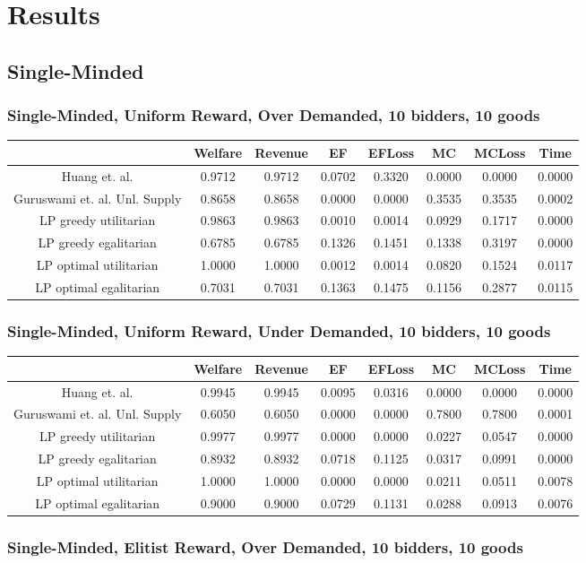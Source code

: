 \section{Results}
\subsection{Single-Minded}
\subsubsection*{Single-Minded, Uniform Reward, Over Demanded, 10 bidders, 10 goods} 
\begin{tabular}{|c|c|c|c|c|c|c|c|}\hline
                            	&Welfare	&Revenue	&EF	&EFLoss	&MC	&MCLoss	&Time	\\\hline
                 Huang et. al.	&0.9712	&0.9712	&0.0702	&0.3320	&0.0000	&0.0000	&0.0000	\\\hline 
 Guruswami et. al. Unl. Supply	&0.8658	&0.8658	&0.0000	&0.0000	&0.3535	&0.3535	&0.0002	\\\hline 
         LP greedy utilitarian	&0.9863	&0.9863	&0.0010	&0.0014	&0.0929	&0.1717	&0.0000	\\\hline 
         LP greedy egalitarian	&0.6785	&0.6785	&0.1326	&0.1451	&0.1338	&0.3197	&0.0000	\\\hline 
        LP optimal utilitarian	&1.0000	&1.0000	&0.0012	&0.0014	&0.0820	&0.1524	&0.0117	\\\hline 
        LP optimal egalitarian	&0.7031	&0.7031	&0.1363	&0.1475	&0.1156	&0.2877	&0.0115	\\\hline 
\end{tabular}\subsubsection*{Single-Minded, Uniform Reward, Under Demanded, 10 bidders, 10 goods} 
\begin{tabular}{|c|c|c|c|c|c|c|c|}\hline
                            	&Welfare	&Revenue	&EF	&EFLoss	&MC	&MCLoss	&Time	\\\hline
                 Huang et. al.	&0.9945	&0.9945	&0.0095	&0.0316	&0.0000	&0.0000	&0.0000	\\\hline 
 Guruswami et. al. Unl. Supply	&0.6050	&0.6050	&0.0000	&0.0000	&0.7800	&0.7800	&0.0001	\\\hline 
         LP greedy utilitarian	&0.9977	&0.9977	&0.0000	&0.0000	&0.0227	&0.0547	&0.0000	\\\hline 
         LP greedy egalitarian	&0.8932	&0.8932	&0.0718	&0.1125	&0.0317	&0.0991	&0.0000	\\\hline 
        LP optimal utilitarian	&1.0000	&1.0000	&0.0000	&0.0000	&0.0211	&0.0511	&0.0078	\\\hline 
        LP optimal egalitarian	&0.9000	&0.9000	&0.0729	&0.1131	&0.0288	&0.0913	&0.0076	\\\hline 
\end{tabular}\subsubsection*{Single-Minded, Elitist Reward, Over Demanded, 10 bidders, 10 goods} 
